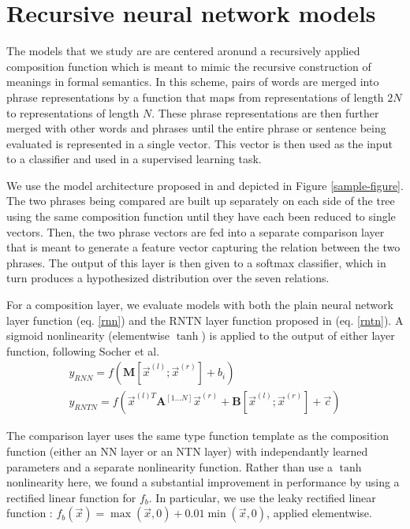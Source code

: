 \section{Recursive neural network models} \label{methods}

The models that we study are are centered aronund a recursively applied composition function which is meant to mimic the recursive construction of meanings in formal semantics. In this scheme, pairs of words are merged into phrase representations by a function that maps from representations of length $2N$ to representations of length $N$. These phrase representations are then further merged with other words and phrases until the entire phrase or sentence being evaluated is represented in a single vector. This vector is then used as the input to a classifier and used in a supervised learning task.

We use the model architecture proposed in \citet{bowman2013can} and depicted in Figure \ref{sample-figure}. The two phrases being compared are built up separately on each side of the tree using the same composition function until they have each been reduced to single vectors. Then, the two phrase vectors are fed into a separate comparison layer that is meant to generate a feature vector capturing the relation between the two phrases. The output of this layer is then given to a softmax classifier, which in turn produces a hypothesized distribution over the seven relations.

For a composition layer, we evaluate models with both the plain neural network layer function (eq. \ref{rnn}) and the RNTN layer function proposed in \citet{chen2013learning} (eq. \ref{rntn}). A sigmoid nonlinearity (elementwise $\tanh$) is applied to the output of either layer function, following Socher et al.
\begin{gather} \label{rnn}
y_{RNN} = f(\mathbf{M} [\vec{x}^{(l)}; \vec{x}^{(r)}] + b_i)\\ %
\label{rntn}
y_{RNTN} = f(\vec{x}^{(l)T} \mathbf{A}^{[1...N]} \vec{x}^{(r)} + \mathbf{B} [\vec{x}^{(l)}; \vec{x}^{(r)}] + \vec{c})
\end{gather} %

The comparison layer uses the same type function template as the composition function (either an NN layer or an NTN layer) with independantly learned parameters and a separate nonlinearity function. Rather than use a $\tanh$ nonlinearity here, we found a substantial improvement in performance by using a rectified linear function for $f_{b}$. In particular, we use the leaky rectified linear function \cite{maasrectifier}: $f_{b}(\vec{x})=\max(\vec{x}, 0) + 0.01\min(\vec{x}, 0)$,  applied elementwise. 


